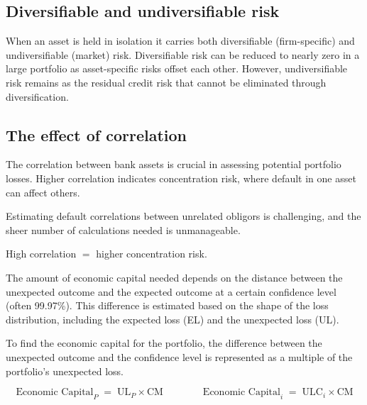 \subsection*{Diversifiable and undiversifiable risk}

When an asset is held in isolation it carries both diversifiable
(firm-specific) and undiversifiable (market) risk. Diversifiable risk can be
reduced to nearly zero in a large portfolio as asset-specific risks offset each
other. However, undiversifiable risk remains as the residual credit risk that
cannot be eliminated through diversification.

\subsection*{The effect of correlation}

The correlation between bank assets is crucial in assessing potential portfolio
losses. Higher correlation indicates concentration risk, where default in one
asset can affect others.

Estimating default correlations between unrelated obligors is challenging, and
the sheer number of calculations needed is unmanageable.

\begin{crkeybox}
High correlation $=$ higher concentration risk.
\end{crkeybox}


The amount of economic capital needed depends on the distance between the
unexpected outcome and the expected outcome at a certain confidence level (often
99.97\%). This difference is estimated based on the shape of the loss
distribution, including the expected loss (EL) and the unexpected loss (UL).

 To find the economic capital for the portfolio,
the difference between the unexpected outcome and the confidence level is
represented as a multiple of the portfolio's unexpected loss.

\begin{crfmlbox}
\[ \text{Economic Capital}_P \;=\; \mathrm{UL}_P \times \mathrm{CM}
   \qquad\qquad
   \text{Economic Capital}_i \;=\; \mathrm{ULC}_i \times \mathrm{CM} \]
\end{crfmlbox}

